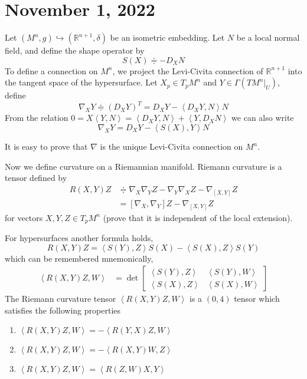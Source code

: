 \documentclass[12pt,a4paper]{article}
\theoremstyle{definition}
\theoremstyle{greenbox}
\newcommand{\define}{\doteqdot}
\newcommand{\Rn}{\mathbb{R}^{n+1}}
\begin{document}
    \section{November 1, 2022}
    Let $ (M^{n},g) \hookrightarrow (\Rn, \delta) $ be an isometric embedding. Let $ N $ be a local normal field, and define the shape operator by
    \[ S(X) \define - D_{X}N \]
    To define a connection on $ M^{n} $, we project the Levi-Civita connection of $ \Rn $ into the tangent space of the hypersurface. Let $ X_{p} \in T_{p}M^{n} $ and $ Y \in \Gamma(TM^{n}|_{U}) $, define 
    \[ \nabla_{X}Y \define (D_{X}Y)^{T} = D_{X}Y - \left< D_{X}Y,N \right>N \]
    From the relation $ 0 = X \left< Y,N \right> = \left< D_{X}Y,N \right> + \left< Y,D_{X}N \right> $ we can also write 
    \[ \nabla_{X}Y = D_{X}Y - \left< S(X),Y \right>N \]
    
    It is easy to prove that $ \nabla $ is the unique Levi-Civita connection on $ M^{n} $.
    
    Now we define curvature on a Riemannian manifold. Riemann curvature is a tensor defined by 
    \begin{align*}
        R(X,Y)Z & \define \nabla_{X} \nabla_{Y}Z - \nabla_{Y}\nabla_{X}Z - \nabla_{[X,Y]}Z\\
        & = [\nabla_{X},\nabla_{Y}]Z - \nabla_{[X,Y]}Z
    \end{align*}
    for vectors $ X,Y,Z \in T_{p}M^{n} $ (prove that it is independent of the local extension).
    
    For hypersurfaces another formula holds, 
    \[ R(X,Y)Z = \left< S(Y),Z \right>S(X) - \left< S(X),Z \right>S(Y) \]
    which can be remembered mnemonically, 
    \begin{align*}
        \left< R(X,Y)Z,W \right> &= \det \begin{bmatrix}
            \left< S(Y),Z \right> & \left< S(Y),W \right>\\ 
            \left< S(X),Z \right> & \left< S(X),W \right>
        \end{bmatrix} 
    \end{align*}
    The Riemann curvature tensor $ \left< R(X,Y)Z,W \right> $ is a $ (0,4) $ tensor which satisfies the following properties   
    \begin{enumerate}
        
        \item $ \left< R(X,Y)Z,W \right> = - \left< R(Y,X)Z,W \right> $
        \item $ \left< R(X,Y)Z,W \right> = - \left< R(X,Y)W,Z \right> $
        \item $ \left< R(X,Y)Z,W \right> = \left< R(Z,W)X,Y \right> $
    \end{enumerate}
\end{document}
